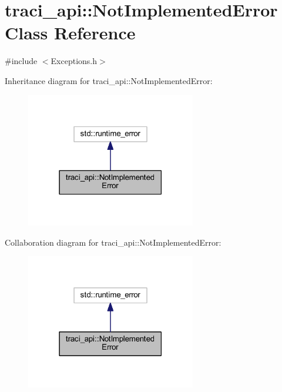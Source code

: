 \hypertarget{classtraci__api_1_1_not_implemented_error}{}\section{traci\+\_\+api\+:\+:Not\+Implemented\+Error Class Reference}
\label{classtraci__api_1_1_not_implemented_error}


{\ttfamily \#include $<$Exceptions.\+h$>$}



Inheritance diagram for traci\+\_\+api\+:\+:Not\+Implemented\+Error\+:\nopagebreak
\begin{figure}[H]
\begin{center}
\leavevmode
\includegraphics[width=210pt]{classtraci__api_1_1_not_implemented_error__inherit__graph}
\end{center}
\end{figure}


Collaboration diagram for traci\+\_\+api\+:\+:Not\+Implemented\+Error\+:\nopagebreak
\begin{figure}[H]
\begin{center}
\leavevmode
\includegraphics[width=210pt]{classtraci__api_1_1_not_implemented_error__coll__graph}
\end{center}
\end{figure}

